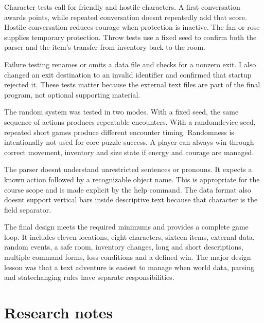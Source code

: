 \documentclass[letterpaper,10pt,english]{sphinxmanual}
\begin{document}
\sphinxAtStartPar
Character tests call  for friendly and hostile characters. A first
conversation awards points, while repeated conversation doesnt repeatedly add
that score. Hostile conversation reduces courage when protection is inactive.
The fan or rose supplies temporary protection. Throw tests use a fixed seed to
confirm both the parser and the item’s transfer from inventory back to the room.

\sphinxAtStartPar
Failure testing renames or omits a data file and checks for a non\sphinxhyphen{}zero exit. I
also changed an exit destination to an invalid identifier and confirmed that
startup rejected it. These tests matter because the external text files are
part of the final program, not optional supporting material.

\sphinxAtStartPar
The random system was tested in two modes. With a fixed seed, the same sequence
of actions produces repeatable encounters. With a random\sphinxhyphen{}device seed, repeated
short games produce different encounter timing. Randomness is intentionally not
used for core puzzle success. A player can always win through correct movement,
inventory and size state if energy and courage are managed.

\sphinxAtStartPar
The parser doesnt understand unrestricted sentences or pronouns. It expects a
known action followed by a recognizable object name. This is appropriate for the
course scope and is made explicit by the help command. The data format also doesnt
support vertical bars inside descriptive text because that character is the
field separator.

\sphinxAtStartPar
The final design meets the required minimums and provides a complete game loop.
It includes eleven locations, eight characters, sixteen items, external data,
random events, a safe room, inventory changes, long and short descriptions,
multiple command forms, loss conditions and a defined win. The major design
lesson was that a text adventure is easiest to manage when world data, parsing
and state\sphinxhyphen{}changing rules have separate responsibilities.


\section{Research notes}
\label{\detokenize{AssignmentFour/main:research-notes}}
\end{document}
